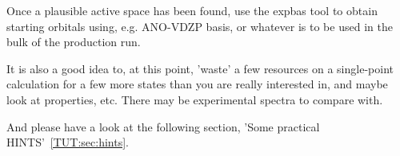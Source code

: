 Once a plausible active space has been found, use the expbas tool to
obtain starting orbitals using, e.g. ANO-VDZP basis, or whatever is 
to be used in the bulk of the production run.

It is also a good idea to, at this point, 'waste' a few resources on
a single-point calculation for a few more states than you are really
interested in, and maybe look at properties, etc. There may be
experimental spectra to compare with.

And please have a look at the following 
section, 'Some practical HINTS'~\ref{TUT:sec:hints}.

